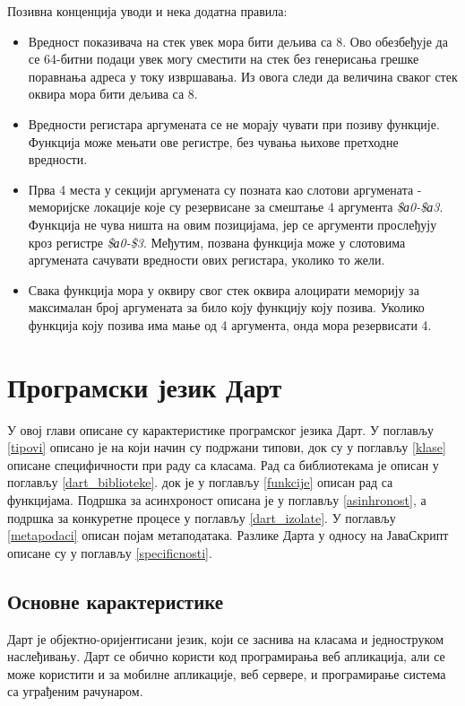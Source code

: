\documentclass[12pt,oneside]{memoir}
\begin{document}
Позивна конценција уводи и нека додатна правила:
\begin{itemize}

\item Вредност показивача на стек увек мора бити дељива са 8. Ово обезбеђује да се 64-битни подаци увек могу сместити на стек без генерисања грешке поравнања адреса у току извршавања. Из овога следи да величина сваког стек оквира мора бити дељива са 8.

\item Вредности регистара аргумената се не морају чувати при позиву функције. Функција може мењати ове регистре, без чувања њихове претходне вредности.

\item Прва 4 места у секцији аргумената су позната као слотови аргумената - меморијске локације које су резервисане за смештање 4 аргумента \textit{\$а0-\$а3}. Функција не чува ништа на овим позицијама, јер се аргументи прослеђују кроз регистре \textit{\$а0-\$3}. Међутим, позвана функција може у слотовима аргумената сачувати вредности ових регистара, уколико то жели.

\item Свака функција мора у оквиру свог стек оквира алоцирати меморију за максималан број аргумената за било коју функцију коју позива. Уколико функција коју позива има мање од 4 аргумента, онда мора резервисати 4.
\end{itemize}


\chapter{Програмски језик Дарт}
\label{chp:dart}
У овој глави описане су карактеристике програмског језика Дарт. У поглављу \ref{tipovi} описано је на који начин су подржани типови, док су у поглављу \ref{klase} описане специфичности при раду са класама. Рад са библиотекама је описан у поглављу \ref{dart_biblioteke}. док је у поглављу \ref{funkcije} описан рад са функцијама. Подршка за асинхроност описана је у поглављу \ref{asinhronost}, а подршка за конкуретне процесе у поглављу \ref{dart_izolate}. У поглављу \ref{metapodaci} описан појам метаподатака. Разлике Дарта у односу на ЈаваСкрипт описане су у поглављу \ref{specificnosti}.

\section{Основне карактеристике}
Дарт је објектно-оријентисани језик, који се заснива на класама и једноструком наслеђивању. Дарт се обично користи код програмирања веб апликација, али се може користити и за мобилне апликације, веб сервере, и програмирање система са уграђеним рачунаром.
\end{document}
